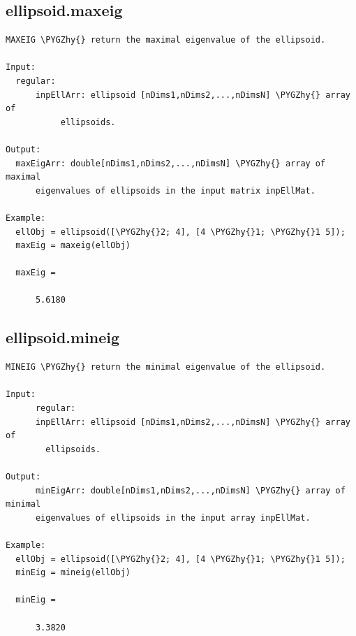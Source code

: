 \documentclass[letterpaper,10pt,english]{sphinxmanual}
\def\PYGZhy{\char`\-}
\begin{document}
\subsection{ellipsoid.maxeig}
\label{chap_functions:ellipsoid-maxeig}
\begin{Verbatim}[commandchars=\\\{\}]
MAXEIG \PYGZhy{} return the maximal eigenvalue of the ellipsoid.

Input:
  regular:
      inpEllArr: ellipsoid [nDims1,nDims2,...,nDimsN] \PYGZhy{} array of
           ellipsoids.

Output:
  maxEigArr: double[nDims1,nDims2,...,nDimsN] \PYGZhy{} array of maximal
      eigenvalues of ellipsoids in the input matrix inpEllMat.

Example:
  ellObj = ellipsoid([\PYGZhy{}2; 4], [4 \PYGZhy{}1; \PYGZhy{}1 5]);
  maxEig = maxeig(ellObj)

  maxEig =

      5.6180
\end{Verbatim}


\subsection{ellipsoid.mineig}
\label{chap_functions:ellipsoid-mineig}
\begin{Verbatim}[commandchars=\\\{\}]
MINEIG \PYGZhy{} return the minimal eigenvalue of the ellipsoid.

Input:
      regular:
      inpEllArr: ellipsoid [nDims1,nDims2,...,nDimsN] \PYGZhy{} array of
        ellipsoids.

Output:
      minEigArr: double[nDims1,nDims2,...,nDimsN] \PYGZhy{} array of minimal
      eigenvalues of ellipsoids in the input array inpEllMat.

Example:
  ellObj = ellipsoid([\PYGZhy{}2; 4], [4 \PYGZhy{}1; \PYGZhy{}1 5]);
  minEig = mineig(ellObj)

  minEig =

      3.3820
\end{Verbatim}
\end{document}
